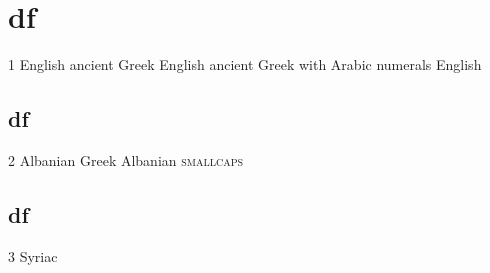 \documentclass{article}
\begin{document}
\part{df}

1 English \textgreek[variant=ancient]{ancient Greek} English
\textgreek[numerals=arabic, variant=ancient]{ancient Greek with Arabic numerals} English

\begin{albanian}%

\part{df}

2 Albanian \textgreek{Greek} Albanian \textsc{smallcaps}

\end{albanian}%
\begin{syriac}%

\part{df}

3 Syriac

\end{syriac}%

\begin{albanian}%
\end{albanian}%
\end{document}
